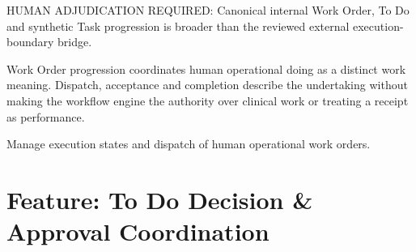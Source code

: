 HUMAN ADJUDICATION REQUIRED: Canonical internal Work Order, To Do and synthetic Task progression is broader than the reviewed external execution-boundary bridge.



Work Order progression coordinates human operational doing as a distinct work meaning. Dispatch, acceptance and completion describe the undertaking without making the workflow engine the authority over clinical work or treating a receipt as performance.



Manage execution states and dispatch of human operational work orders.


\section{Feature: To Do Decision \& Approval Coordination}
\label{feature:feat-ise-21}
\begingroup\small\setlength{\TableWidth}{\dimexpr\linewidth-6\tabcolsep-4\arrayrulewidth\relax}
